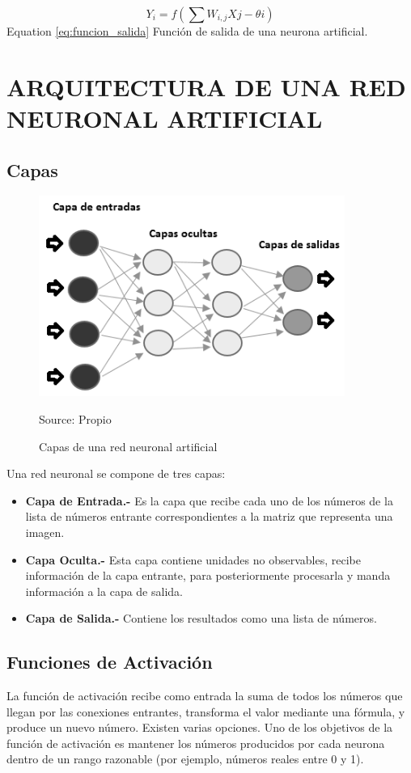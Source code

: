 \begin{equation}\label{eq:funcion_salida}
Y_{i} = f(\sum W_{i,j}X{j} - \theta{i})
\end{equation}
Equation \eqref{eq:funcion_salida} Función de salida de una neurona artificial.


\section{ARQUITECTURA DE UNA RED NEURONAL ARTIFICIAL}
\subsection{Capas}

\begin{figure}[H]
		\centering
		\includegraphics[width=100mm]{./Imagenes/capas_red_neuronal.png}
		\caption{Capas de una red neuronal artificial}
		Source: Propio
		\label{fig:capa_red_neuronal}
\end{figure} 

Una red neuronal se compone de tres capas:
\begin{itemize}
\item \textbf{Capa de Entrada.- }Es la capa que recibe cada uno de los números de la
lista de números entrante correspondientes a la matriz que representa una
imagen.
\item \textbf{Capa Oculta.- }Esta capa contiene unidades no observables, recibe
información de la capa entrante, para posteriormente procesarla y manda
información a la capa de salida.
\item \textbf{Capa de Salida.-} Contiene los resultados como una lista de números.
\end{itemize}


\subsection{Funciones de Activación}
La función de activación recibe como entrada la suma de todos los números que
llegan por las conexiones entrantes, transforma el valor mediante una fórmula, y produce
un nuevo número. Existen varias opciones. Uno de los objetivos de la función de
activación es mantener los números producidos por cada neurona dentro de un rango
razonable (por ejemplo, números reales entre 0 y 1).

